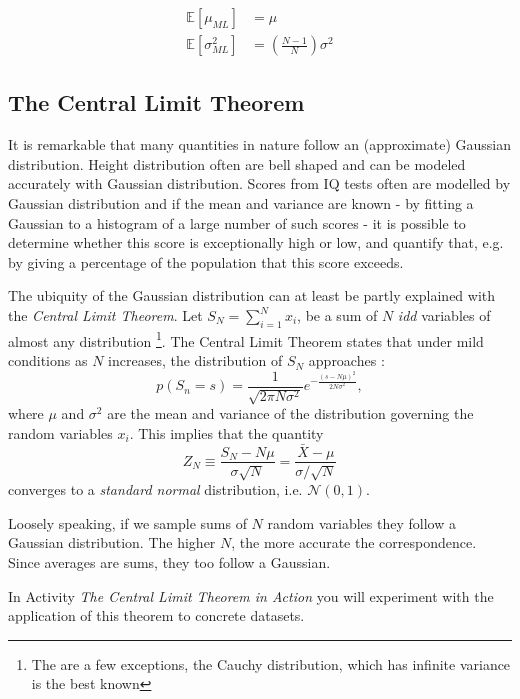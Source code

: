 \begin{align}
\mathbb{E}[\mu_{ML}] & = \mu \\
\mathbb{E}[\sigma^2_{ML}] &= (\frac{N-1}{N}) \sigma^2 \nonumber
\end{align}

  \subsection{The Central Limit Theorem}    
  It is remarkable that many quantities in nature follow an (approximate) Gaussian  distribution. Height
  distribution often are bell shaped and can be modeled accurately with Gaussian distribution. Scores
  from IQ tests often are modelled by Gaussian distribution and if the mean and variance are known
  - by fitting a Gaussian to a histogram of a large number of such scores - it is possible to determine
  whether this score is exceptionally high or low, and quantify that, e.g. by giving a percentage
  of the population that this score exceeds.

  The ubiquity of the Gaussian distribution can at least be partly explained with  the
  \emph{Central Limit Theorem}. Let $S_N =  \sum^N_{i=1} x_i$, be  a sum of $N$ \emph{idd} variables of almost any distribution \footnote{The are a few exceptions, the Cauchy distribution,
    which has infinite variance is the best known}. The Central Limit Theorem
  states that under mild conditions \cite{gardiner2009} as $N$ increases, the distribution
  of $S_N$ approaches \cite{murphy2012}:
  \begin{equation}
    p(S_n = s) = \frac{1}{\sqrt{2 \pi N \sigma^2}}e^{-\frac{(s-N\mu)^2}{2N\sigma^2}},
    \label{eq-clt}
  \end{equation}
  where $\mu$ and $\sigma^2$ are the mean and variance of the distribution governing the random variables $x_i$.
  This implies that the  quantity
  $$
  Z_N \equiv \frac{S_N - N \mu}{\sigma \sqrt{N}} = \frac{\bar{X} - \mu}{\sigma/\sqrt{N}}
  $$
  converges to a \emph{standard normal} distribution, i.e. $\mathcal{N}(0,1)$.

  Loosely speaking, if we sample sums of $N$ random variables they  follow a Gaussian distribution. The
  higher $N$, the more accurate the correspondence. Since averages are sums, they too follow
  a Gaussian.

  In Activity \emph{The Central Limit Theorem in Action} you will experiment with the application of this theorem to concrete datasets.  
  

